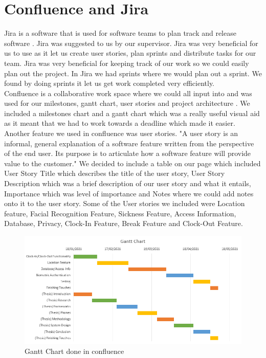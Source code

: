 \section{Confluence and Jira}
Jira is a software that is used for software teams to plan track and release software \cite{jira}. Jira was suggested to us by our supervisor. Jira was very beneficial for us to use as it let us create user stories, plan sprints and distribute tasks for our team. Jira was very beneficial for keeping track of our work so we could easily plan out the project. In Jira we had sprints where we would plan out a sprint. We found by doing sprints it let us get work completed very efficiently.
\\
Confluence is a collaborative work space where we could all input into and was used for our milestones, gantt chart, user stories and project architecture \cite{confluence}. We included a milestones chart and a gantt chart which was a really useful visual aid as it meant that we had to work towards a deadline which made it easier.
Another feature we used in confluence was user stories. "A user story is an informal, general explanation of a software feature written from the perspective of the end user. Its purpose is to articulate how a software feature will provide value to the customer." \cite{UserStory} We decided to include a table on our page which included User Story Title which describes the title of the user story, User Story Description which was a brief description of our user story and what it entails, Importance which was level of importance and Notes where we could add notes onto it to the user story. Some of the User stories we included were Location feature, Facial Recognition Feature, Sickness Feature, Access Information, Database, Privacy, Clock-In Feature, Break Feature and Clock-Out Feature. \\
\begin{figure}
    \includegraphics[width=1\textwidth]{img/Gantt_Chart.png}
    \caption{Gantt Chart done in confluence}
    \label{fig}
\end{figure}

